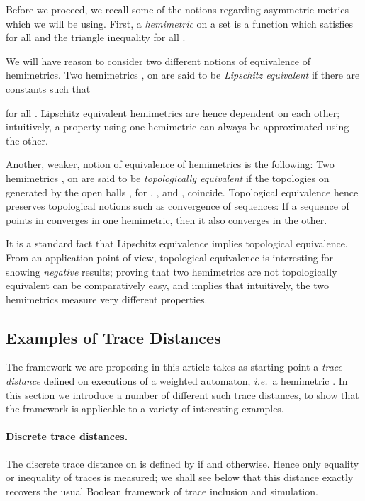 \documentclass[copyright,creativecommons,sharealike]{eptcs}
\theoremstyle{plain}
\newcommand*\ie{\textit{i.e.}}
\begin{document}
Before we proceed, we recall some of the notions regarding asymmetric
metrics which we will be using.  First, a \emph{hemimetric} on a set
 is a function  which satisfies  for all  and the triangle inequality  for all .

We will have reason to consider two different notions of equivalence
of hemimetrics. Two hemimetrics ,  on  are said to be
\emph{Lipschitz equivalent} if there are constants 
such that

for all .  Lipschitz equivalent hemimetrics are hence
dependent on each other; intuitively, a property using one hemimetric
can always be approximated using the other.

Another, weaker, notion of equivalence of hemimetrics is the
following: Two hemimetrics ,  on  are said to be
\emph{topologically equivalent} if the topologies on  generated by
the open balls , for , , and , coincide.  Topological equivalence hence
preserves topological notions such as convergence of sequences: If a
sequence  of points in  converges in one hemimetric, then
it also converges in the other.

It is a standard fact that Lipschitz equivalence implies topological
equivalence.  From an application point-of-view, topological
equivalence is interesting for showing \emph{negative} results;
proving that two hemimetrics are not topologically equivalent can be
comparatively easy, and implies that intuitively, the two hemimetrics
measure very different properties.

\subsection{Examples of Trace Distances}
\label{sec:trace_distances}

The framework we are proposing in this article takes as starting point
a \emph{trace distance} defined on executions of a weighted automaton,
\ie~a hemimetric .
In this section we introduce a number of different such trace
distances, to show that the framework is applicable to a variety of
interesting examples.

\paragraph{Discrete trace distances.}
\label{ex:lts}

The discrete trace distance on  is defined by  if  and 
otherwise.  Hence only equality or inequality of traces is measured;
we shall see below that this distance exactly recovers the usual
Boolean framework of trace inclusion and simulation.
\end{document}
